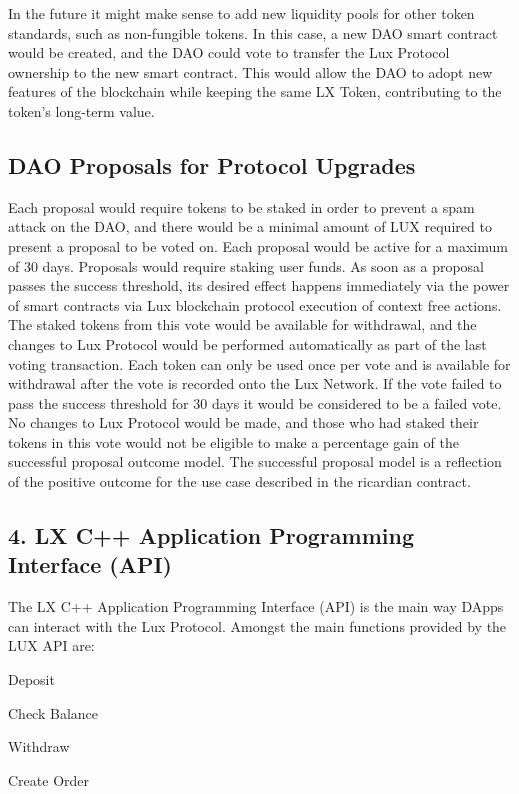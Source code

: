 \documentclass[11pt]{article}
\begin{document}
In the future it might make sense to add new liquidity pools for other token standards, such as non-fungible tokens. In this case, a new DAO smart contract would be created, and the DAO could vote to transfer the Lux Protocol ownership to the new smart contract. This would allow the DAO to adopt new features of the blockchain while keeping the same LX Token, contributing to the token's long-term value.


\subsection{DAO Proposals for Protocol Upgrades}

Each proposal would require tokens to be staked in order to prevent a spam attack on the DAO, and there would be a minimal amount of LUX required to present a proposal to be voted on. Each proposal would be active for a maximum of 30 days. Proposals would require staking user funds. As soon as a proposal passes the success threshold, its desired effect happens immediately via the power of smart contracts via Lux  blockchain protocol execution of context free actions. The staked tokens from this vote would be available for withdrawal, and the changes to Lux Protocol would be performed automatically as part of the last voting transaction. Each token can only be used once per vote and is available for withdrawal after the vote is recorded onto the Lux Network.  If the vote failed to pass the success threshold for 30 days it would be considered to be a failed vote. No changes to Lux Protocol would be made, and those who had staked their tokens in this vote would not be eligible to make a percentage gain of the successful proposal outcome model. The successful proposal model is a reflection of the positive outcome for the use case described in the ricardian contract.


\subsection{4. LX C++ Application Programming Interface (API)}

The LX C++ Application Programming Interface (API) is the main way DApps can interact with the Lux Protocol. Amongst the main functions provided by the LUX API are:


Deposit


Check Balance


Withdraw


Create Order
\end{document}
